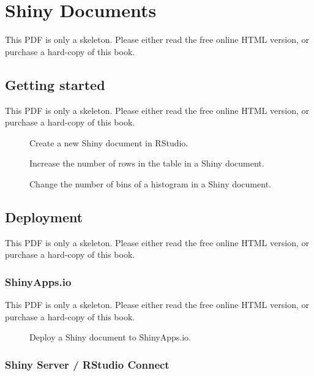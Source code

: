 \documentclass[
  11pt,
]{krantz}
\theoremstyle{definition}
\theoremstyle{definition}
\theoremstyle{definition}
\theoremstyle{definition}
\theoremstyle{remark}
\begin{document}
\chapter{Shiny Documents}\label{shiny-documents}

This PDF is only a skeleton. Please either read the free online HTML version, or purchase a hard-copy of this book.

\section{Getting started}\label{shiny-start}

This PDF is only a skeleton. Please either read the free online HTML version, or purchase a hard-copy of this book.

\begin{figure}\caption{Create a new Shiny document in RStudio.}\end{figure}

\begin{figure}\caption{Increase the number of rows in the table in a Shiny document.}\end{figure}

\begin{figure}\caption{Change the number of bins of a histogram in a Shiny document.}\end{figure}

\section{Deployment}\label{shiny-deploy}

This PDF is only a skeleton. Please either read the free online HTML version, or purchase a hard-copy of this book.

\subsection{ShinyApps.io}\label{shinyapps.io}

This PDF is only a skeleton. Please either read the free online HTML version, or purchase a hard-copy of this book.

\begin{figure}\caption{Deploy a Shiny document to ShinyApps.io.}\end{figure}

\subsection{Shiny Server / RStudio Connect}\label{shiny-server-rstudio-connect}
\end{document}
